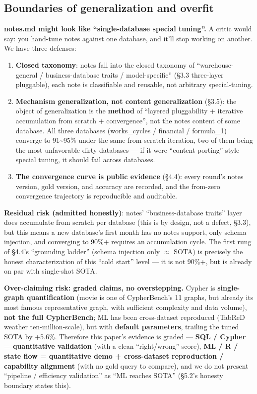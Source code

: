 \documentclass[11pt]{article}
\begin{document}
\subsection{Boundaries of generalization and overfit}

\textbf{ notes.md might look like ``single-database special tuning''.} A critic would say: you hand-tune notes against one database, and it'll stop working on another. We have three defenses:

\begin{enumerate}
\def\labelenumi{\arabic{enumi}.}
\item
  \textbf{Closed taxonomy}: notes fall into the closed taxonomy of ``warehouse-general / business-database traits / model-specific'' (\S{}3.3 three-layer pluggable), each note is classifiable and reusable, not arbitrary special-tuning.
\item
  \textbf{Mechanism generalization, not content generalization} (\S{}3.5): the object of generalization is the \textbf{method} of ``layered pluggability + iterative accumulation from scratch + convergence'', not the notes content of some database. All three databases (works\_cycles / financial / formula\_1) converge to 91\textasciitilde95\% under the same from-scratch iteration, two of them being the most unfavorable dirty databases --- if it were ``content porting''-style special tuning, it should fail across databases.
\item
  \textbf{The convergence curve is public evidence} (\S{}4.4): every round's notes version, gold version, and accuracy are recorded, and the from-zero convergence trajectory is reproducible and auditable.
\end{enumerate}

\textbf{Residual risk (admitted honestly)}: notes' ``business-database traits'' layer does accumulate from scratch per database (this is by design, not a defect, \S{}3.3), but this means a new database's first month has no notes support, only schema injection, and converging to 90\%+ requires an accumulation cycle. The first rung of \S{}4.4's ``grounding ladder'' (schema injection only $\approx$ SOTA) is precisely the honest characterization of this ``cold start'' level --- it is not 90\%+, but is already on par with single-shot SOTA.

\textbf{ Over-claiming risk: graded claims, no overstepping.} Cypher is \textbf{single-graph quantification} (movie is one of CypherBench's 11 graphs, but already its most famous representative graph, with sufficient complexity and data volume), \textbf{not the full CypherBench}; ML has been cross-dataset reproduced (TabReD weather ten-million-scale), but with \textbf{default parameters}, trailing the tuned SOTA by +5.6\%. Therefore this paper's evidence is graded --- \textbf{SQL / Cypher = quantitative validation} (with a clean ``right/wrong'' score), \textbf{ML / R / state flow = quantitative demo + cross-dataset reproduction / capability alignment} (with no gold query to compare), and we do not present ``pipeline / efficiency validation'' as ``ML reaches SOTA'' (\S{}5.2's honesty boundary states this).
\end{document}
